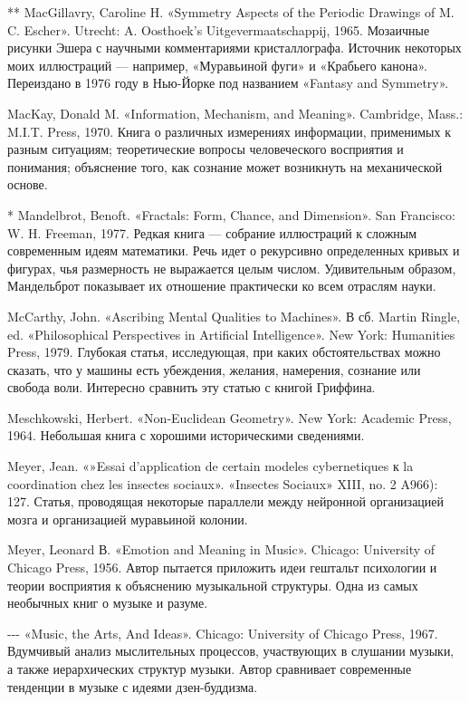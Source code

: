 ** MacGillavry, Caroline H. «Symmetry Aspects of the Periodic Drawings of M. C. Escher». Utrecht: A. Oosthoek's Uitgevermaatschappij, 1965. Мозаичные рисунки Эшера с научными комментариями кристаллографа. Источник некоторых моих иллюстраций --- например, «Муравьиной фуги» и «Крабьего канона». Переиздано в 1976 году в Нью-Йорке под названием «Fantasy and Symmetry».

MacKay, Donald M. «Information, Mechanism, and Meaning». Cambridge, Mass.: M.I.T. Press, 1970. Книга о различных измерениях информации, применимых к разным ситуациям; теоретические вопросы человеческого восприятия и понимания; объяснение того, как сознание может возникнуть на механической основе.

* Mandelbrot, Benoft. «Fractals: Form, Chance, and Dimension». San Francisco: W. H. Freeman, 1977. Редкая книга --- собрание иллюстраций к сложным современным идеям математики. Речь идет о рекурсивно определенных кривых и фигурах, чья размерность не выражается целым числом. Удивительным образом, Мандельброт показывает их отношение практически ко всем отраслям науки.

McCarthy, John. «Ascribing Mental Qualities to Machines». В сб. Martin Ringle, ed. «Philosophical Perspectives in Artificial Intelligence». New York: Humanities Press, 1979. Глубокая статья, исследующая, при каких обстоятельствах можно сказать, что у машины есть убеждения, желания, намерения, сознание или свобода воли. Интересно сравнить эту статью с книгой Гриффина.

Meschkowski, Herbert. «Non-Euclidean Geometry». New York: Academic Press, 1964. Небольшая книга с хорошими историческими сведениями.

Meyer, Jean. «»Essai d'application de certain modeles cybernetiques к la coordination chez les insectes sociaux». «Insectes Sociaux» XIII, no. 2 A966): 127. Статья, проводящая некоторые параллели между нейронной организацией мозга и организацией муравьиной колонии.

Meyer, Leonard В. «Emotion and Meaning in Music». Chicago: University of Chicago Press, 1956. Автор пытается приложить идеи гештальт психологии и теории восприятия к объяснению музыкальной структуры. Одна из самых необычных книг о музыке и разуме.

-\/-\/- «Music, the Arts, And Ideas». Chicago: University of Chicago Press, 1967. Вдумчивый анализ мыслительных процессов, участвующих в слушании музыки, а также иерархических структур музыки. Автор сравнивает современные тенденции в музыке с идеями дзен-буддизма.

